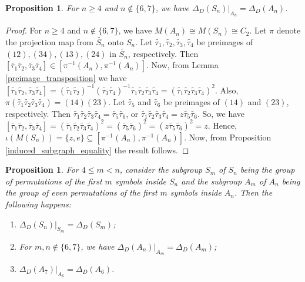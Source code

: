 \documentclass[12pt,a4paper]{article}
\newtheorem{proposition}[theorem]{Proposition}
\begin{document}
\begin{proposition}\label{induced_over_alternating}
For $n\geq 4$ and $n\notin \{6,7\}$, we have $\Delta_D(S_n)\vert_{A_n}=\Delta_D(A_n)$.    
\end{proposition}
\begin{proof}
For $n\geq 4$ and $n\notin \{6,7\}$, we have $M(A_n)\cong M(S_n)\cong C_2$. Let $\pi$ denote the projection map from $\tilde{S_n}$ onto $S_n$. Let $\tilde{\tau_1},\tilde{\tau_2},\tilde{\tau_3},\tilde{\tau_4}$ be preimages of $(12),(34),(13),(24)$ in $\tilde{S_n}$, respectively. Then $[\tilde{\tau_1}\tilde{\tau_2},\tilde{\tau_3}\tilde{\tau_4}]\in [\pi^{-1}(A_n),\pi^{-1}(A_n)]$. Now, from Lemma \ref{preimage_transposition} we have $[\tilde{\tau_1}\tilde{\tau_2},\tilde{\tau_3}\tilde{\tau_4}]=(\tilde{\tau_1}\tilde{\tau_2})^{-1}(\tilde{\tau_3}\tilde{\tau_4})^{-1}\tilde{\tau_1}\tilde{\tau_2}\tilde{\tau_3}\tilde{\tau_4}=(\tilde{\tau_1}\tilde{\tau_2}\tilde{\tau_3}\tilde{\tau_4})^2$. Also, $\pi(\tilde{\tau_1}\tilde{\tau_2}\tilde{\tau_3}\tilde{\tau_4})=(14)(23)$. Let $\tilde{\tau_5}$ and $\tilde{\tau_6}$ be preimages of $(14)$ and $(23)$, respectively. Then $\tilde{\tau_1}\tilde{\tau_2}\tilde{\tau_3}\tilde{\tau_4}=\tilde{\tau_5}\tilde{\tau_6}$, or $\tilde{\tau_1}\tilde{\tau_2}\tilde{\tau_3}\tilde{\tau_4}=z\tilde{\tau_5}\tilde{\tau_6}$. So, we have $[\tilde{\tau_1}\tilde{\tau_2},\tilde{\tau_3}\tilde{\tau_4}]=(\tilde{\tau_1}\tilde{\tau_2}\tilde{\tau_3}\tilde{\tau_4})^2=(\tilde{\tau_5}\tilde{\tau_6})^2=(z\tilde{\tau_5}\tilde{\tau_6})^2=z$. Hence, $\iota(M(S_n))=\{z,e\}\subseteq [\pi^{-1}(A_n),\pi^{-1}(A_n)]$. Now, from Proposition \ref{induced_subgraph_equality} the result follows.
\end{proof}
\begin{proposition}\label{induced_S_n and A_n}
 For $4\leq m< n$, consider the subgroup $S_m$ of $S_n$ being the group of permutations of the first $m$ symbols inside $S_n$ and the subgroup $A_m$ of $A_n$ being the group of even permutations of the first $m$ symbols inside $A_n$. Then the following happens:
 \begin{enumerate}[\rm (i)]
     \item $\Delta_D(S_n)\vert_{S_m}=\Delta_D(S_m)$;
     \item For $m,n\notin\{6,7\}$, we have $\Delta_D(A_n)\vert_{A_m}=\Delta_D(A_m)$;
     \item $\Delta_D(A_7)\vert_{A_6}=\Delta_D(A_6)$.
 \end{enumerate}    
\end{proposition}
\end{document}
